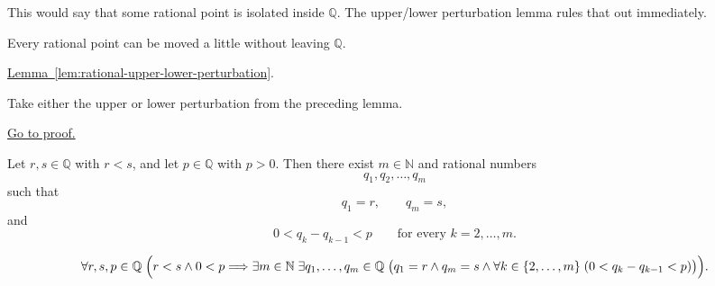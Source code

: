 \begin{remark*}
This would say that some rational point is isolated inside $\mathbb{Q}$. The
upper/lower perturbation lemma rules that out immediately.
\end{remark*}

\begin{remark*}[Interpretation]
Every rational point can be moved a little without leaving $\mathbb{Q}$.
\end{remark*}

\begin{remark*}[Dependencies]
\hyperref[lem:rational-upper-lower-perturbation]{Lemma~\ref*{lem:rational-upper-lower-perturbation}}.
\end{remark*}

\begin{remark*}
Take either the upper or lower perturbation from the preceding lemma.
\end{remark*}

\begin{remark*}[Proof]
\hyperref[prf:rational-perturbation-lemma]{Go to proof.}
\end{remark*}

\begin{tcolorbox}[colback=thmbox, colframe=thmborder, arc=2pt,
  left=6pt, right=6pt, top=4pt, bottom=4pt,
  title={\small\textbf{Theorem (Rational Chain with Uniformly Small Steps)}},
  fonttitle=\small\bfseries]
\begin{theorem}
\label{thm:rational-chain-with-small-steps}
Let $r,s\in\mathbb{Q}$ with $r<s$, and let $p\in\mathbb{Q}$ with $p>0$.
Then there exist $m\in\mathbb{N}$ and rational numbers
\[
q_1,q_2,\dots,q_m
\]
such that
\[
q_1=r,
\qquad
q_m=s,
\]
and
\[
0<q_k-q_{k-1}<p
\qquad
\text{for every }k=2,\dots,m.
\]
\end{theorem}
\end{tcolorbox}

\begin{remark*}
\[
\forall r,s,p\in\mathbb{Q}\;
\Bigl(
r<s \land 0<p
\Longrightarrow
\exists m\in\mathbb{N}\;\exists q_1,\dots,q_m\in\mathbb{Q}\;
\bigl(
q_1=r \land q_m=s \land \forall k\in\{2,\dots,m\}\;(0<q_k-q_{k-1}<p)
\bigr)
\Bigr).
\]
\end{remark*}

